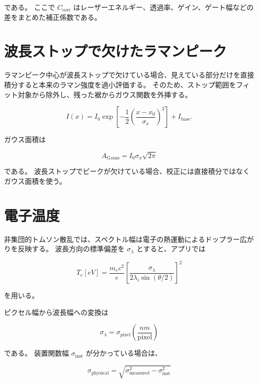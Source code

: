 \documentclass[11pt]{ltjsarticle}
\begin{document}
である。
ここで $C_{\mathrm{corr}}$ はレーザーエネルギー、透過率、ゲイン、ゲート幅などの差をまとめた補正係数である。

\section{波長ストップで欠けたラマンピーク}

ラマンピーク中心が波長ストップで欠けている場合、見えている部分だけを直接積分すると本来のラマン強度を過小評価する。
そのため、ストップ範囲をフィット対象から除外し、残った裾からガウス関数を外挿する。

\begin{equation}
I(x)
=
I_0
\exp\left[
-\frac{1}{2}
\left(
\frac{x-x_0}{\sigma_x}
\right)^2
\right]
+ I_{\mathrm{base}}.
\end{equation}

ガウス面積は

\begin{equation}
A_{\mathrm{Gauss}}
=
I_0\sigma_x\sqrt{2\pi}
\end{equation}

である。
波長ストップでピークが欠けている場合、校正には直接積分ではなくガウス面積を使う。

\section{電子温度}

非集団的トムソン散乱では、スペクトル幅は電子の熱運動によるドップラー広がりを反映する。
波長方向の標準偏差を $\sigma_\lambda$ とすると、アプリでは

\begin{equation}
T_e[\si{eV}]
=
\frac{m_e c^2}{e}
\left[
\frac{\sigma_\lambda}
{2\lambda_i\sin(\theta/2)}
\right]^2
\end{equation}

を用いる。

ピクセル幅から波長幅への変換は

\begin{equation}
\sigma_\lambda
=
\sigma_{\mathrm{pixel}}
\left(\frac{\si{nm}}{\mathrm{pixel}}\right)
\end{equation}

である。
装置関数幅 $\sigma_{\mathrm{inst}}$ が分かっている場合は、

\begin{equation}
\sigma_{\mathrm{physical}}
=
\sqrt{
\sigma_{\mathrm{measured}}^2
-
\sigma_{\mathrm{inst}}^2
}
\end{equation}
\end{document}
